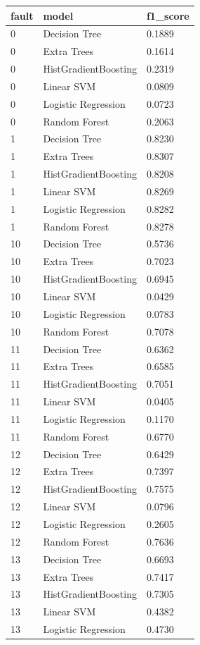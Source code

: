 \begin{tabular}{lll}
\toprule
fault & model & f1\_score \\
\midrule
0 & Decision Tree & 0.1889 \\
0 & Extra Trees & 0.1614 \\
0 & HistGradientBoosting & 0.2319 \\
0 & Linear SVM & 0.0809 \\
0 & Logistic Regression & 0.0723 \\
0 & Random Forest & 0.2063 \\
1 & Decision Tree & 0.8230 \\
1 & Extra Trees & 0.8307 \\
1 & HistGradientBoosting & 0.8208 \\
1 & Linear SVM & 0.8269 \\
1 & Logistic Regression & 0.8282 \\
1 & Random Forest & 0.8278 \\
10 & Decision Tree & 0.5736 \\
10 & Extra Trees & 0.7023 \\
10 & HistGradientBoosting & 0.6945 \\
10 & Linear SVM & 0.0429 \\
10 & Logistic Regression & 0.0783 \\
10 & Random Forest & 0.7078 \\
11 & Decision Tree & 0.6362 \\
11 & Extra Trees & 0.6585 \\
11 & HistGradientBoosting & 0.7051 \\
11 & Linear SVM & 0.0405 \\
11 & Logistic Regression & 0.1170 \\
11 & Random Forest & 0.6770 \\
12 & Decision Tree & 0.6429 \\
12 & Extra Trees & 0.7397 \\
12 & HistGradientBoosting & 0.7575 \\
12 & Linear SVM & 0.0796 \\
12 & Logistic Regression & 0.2605 \\
12 & Random Forest & 0.7636 \\
13 & Decision Tree & 0.6693 \\
13 & Extra Trees & 0.7417 \\
13 & HistGradientBoosting & 0.7305 \\
13 & Linear SVM & 0.4382 \\
13 & Logistic Regression & 0.4730 \\

\end{tabular}
